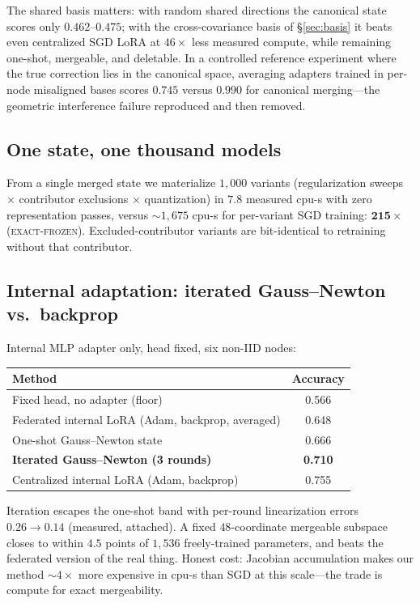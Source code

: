 \documentclass[11pt]{article}
\begin{document}
The shared basis matters: with random shared directions the canonical
state scores only $0.462$--$0.475$; with the cross-covariance basis of
\S\ref{sec:basis} it beats even centralized SGD LoRA at $46\times$ less
measured compute, while remaining one-shot, mergeable, and deletable. In
a controlled reference experiment where the true correction lies in the
canonical space, averaging adapters trained in per-node misaligned bases
scores $0.745$ versus $0.990$ for canonical merging---the geometric
interference failure reproduced and then removed.

\subsection{One state, one thousand models}
From a single merged state we materialize $1{,}000$ variants
(regularization sweeps $\times$ contributor exclusions $\times$
quantization) in $7.8$ measured cpu-s with zero representation passes,
versus $\sim\!1{,}675$ cpu-s for per-variant SGD training:
$\mathbf{215\times}$ (\textsc{exact-frozen}). Excluded-contributor
variants are bit-identical to retraining without that contributor.

\subsection{Internal adaptation: iterated Gauss--Newton vs.\ backprop}
Internal MLP adapter only, head fixed, six non-IID nodes:

\begin{center}
\begin{tabular}{lc}
\toprule
Method & Accuracy \\
\midrule
Fixed head, no adapter (floor) & 0.566 \\
Federated internal LoRA (Adam, backprop, averaged) & 0.648 \\
One-shot Gauss--Newton state & 0.666 \\
\textbf{Iterated Gauss--Newton (3 rounds)} & \textbf{0.710} \\
Centralized internal LoRA (Adam, backprop) & 0.755 \\
\bottomrule
\end{tabular}
\end{center}

Iteration escapes the one-shot band with per-round linearization errors
$0.26\!\to\!0.14$ (measured, attached). A fixed $48$-coordinate mergeable
subspace closes to within $4.5$ points of $1{,}536$ freely-trained
parameters, and beats the federated version of the real thing. Honest
cost: Jacobian accumulation makes our method $\sim\!4\times$ more
expensive in cpu-s than SGD at this scale---the trade is compute for
exact mergeability.
\end{document}
